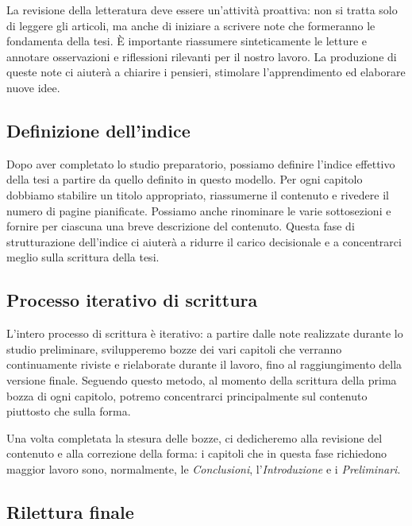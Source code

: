 \medskip

La revisione della letteratura deve essere un'attività proattiva: non si tratta solo di leggere gli articoli, ma anche di iniziare a scrivere note che formeranno le fondamenta della tesi\footnotemark. È importante riassumere sinteticamente le letture e annotare osservazioni e riflessioni rilevanti per il nostro lavoro. La produzione di queste note ci aiuterà a chiarire i pensieri, stimolare l'apprendimento ed elaborare nuove idee.


\subsection{Definizione dell'indice}

Dopo aver completato lo studio preparatorio, possiamo definire l'indice effettivo della tesi a partire da quello definito in questo modello. Per ogni capitolo dobbiamo stabilire un titolo appropriato, riassumerne il contenuto e rivedere il numero di pagine pianificate. Possiamo anche rinominare le varie sottosezioni e fornire per ciascuna una breve descrizione del contenuto. Questa fase di strutturazione dell'indice ci aiuterà a ridurre il carico decisionale e a concentrarci meglio sulla scrittura della tesi.

\subsection{Processo iterativo di scrittura}

L'intero processo di scrittura è iterativo: a partire dalle note realizzate durante lo studio preliminare, svilupperemo bozze dei vari capitoli che verranno continuamente riviste e rielaborate durante il lavoro, fino al raggiungimento della versione finale. Seguendo questo metodo, al momento della scrittura della prima bozza di ogni capitolo, potremo concentrarci principalmente sul contenuto piuttosto che sulla forma.

\medskip

Una volta completata la stesura delle bozze, ci dedicheremo alla revisione del contenuto e alla correzione della forma: i capitoli che in questa fase richiedono maggior lavoro sono, normalmente, le \textit{Conclusioni}, l'\textit{Introduzione} e i \textit{Preliminari}. 

\subsection{Rilettura finale}

